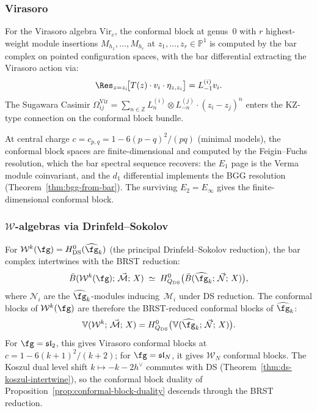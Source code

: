\subsubsection{Virasoro}

For the Virasoro algebra $\mathrm{Vir}_c$, the conformal block at
genus~$0$ with $r$ highest-weight module insertions
$M_{h_1}, \ldots, M_{h_r}$ at $z_1, \ldots, z_r \in \mathbb{P}^1$
is computed by the bar complex on pointed configuration spaces, with
the bar differential extracting the Virasoro action via:
\[
\Res_{z = z_i}\!\bigl[T(z) \cdot v_i \cdot \eta_{z,z_i}\bigr]
= L_{-1}^{(i)} v_i.
\]
The Sugawara Casimir
$\Omega^{\mathrm{Vir}}_{ij}
= \sum_{n \in \mathbb{Z}} L_n^{(i)} \otimes L_{-n}^{(j)}
\cdot (z_i - z_j)^{n}$
enters the KZ-type connection on the conformal block bundle.

At central charge $c = c_{p,q} = 1 - 6(p-q)^2/(pq)$ (minimal
models), the conformal block spaces are finite-dimensional and
computed by the Feigin--Fuchs resolution, which the bar spectral
sequence recovers: the $E_1$ page is the Verma module coinvariant,
and the $d_1$ differential implements the BGG resolution
(Theorem~\ref{thm:bgg-from-bar}).  The surviving $E_2 = E_\infty$
gives the finite-dimensional conformal block.

\subsubsection{$\mathcal{W}$-algebras via Drinfeld--Sokolov}

For $\mathcal{W}^k(\fg) = H^0_{\mathrm{DS}}(\widehat{\fg}_k)$
(the principal Drinfeld--Sokolov reduction), the bar complex
intertwines with the BRST reduction:
\begin{equation}\label{eq:ds-bar-intertwining}
\bar{B}(\mathcal{W}^k(\fg);\, \vec{\mathcal{M}};\, X)
\;\simeq\;
H^0_{Q_{\mathrm{DS}}}\bigl(
\bar{B}(\widehat{\fg}_k;\, \vec{\mathcal{N}};\, X)\bigr),
\end{equation}
where $\mathcal{N}_i$ are the $\widehat{\fg}_k$-modules
inducing~$\mathcal{M}_i$ under DS reduction.
The conformal blocks of $\mathcal{W}^k(\fg)$ are therefore the
BRST-reduced conformal blocks of $\widehat{\fg}_k$:
\[
\mathbb{V}(\mathcal{W}^k;\, \vec{\mathcal{M}};\, X)
= H^0_{Q_{\mathrm{DS}}}\bigl(
\mathbb{V}(\widehat{\fg}_k;\, \vec{\mathcal{N}};\, X)\bigr).
\]
For $\fg = \mathfrak{sl}_2$, this gives Virasoro conformal blocks
at $c = 1 - 6(k+1)^2/(k+2)$; for $\fg = \mathfrak{sl}_N$, it
gives $\mathcal{W}_N$ conformal blocks.  The Koszul dual level
shift $k \mapsto -k - 2h^\vee$ commutes with DS
(Theorem~\ref{thm:ds-koszul-intertwine}), so the conformal block
duality of Proposition~\ref{prop:conformal-block-duality} descends
through the BRST reduction.

